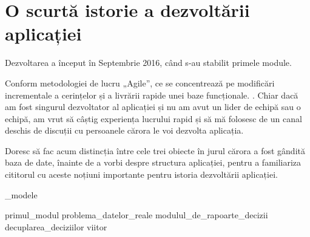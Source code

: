 
\chapter{O scurtă istorie a dezvoltării aplicației}

	Dezvoltarea a început în Septembrie 2016, când s-au stabilit primele module.

	Conform metodologiei de lucru „Agile”, ce se concentrează pe modificări incrementale a cerințelor și a livrării rapide unei baze funcționale. \cite{agile}. Chiar dacă am fost singurul dezvoltator al aplicației și nu am avut un lider de echipă sau o echipă, am vrut să câștig experiența lucrului rapid și să mă folosesc de un canal deschis de discuții cu persoanele cărora le voi dezvolta aplicația.

	Doresc să fac acum distincția între cele trei obiecte în jurul cărora a fost gândită baza de date, înainte de a vorbi despre structura aplicației, pentru a familiariza cititorul cu aceste noțiuni importante pentru istoria dezvoltării aplicației.

	{_modele}

	{primul_modul}
	{problema_datelor_reale}
	{modulul_de_rapoarte_decizii}
	{decuplarea_deciziilor}
	{viitor}
